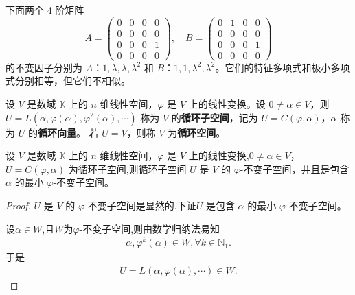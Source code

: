 \documentclass[../../main.tex]{subfiles}%
\begin{document}
\begin{example}
下面两个 4 阶矩阵
\[
A = \begin{pmatrix}
0 & 0 & 0 & 0 \\
0 & 0 & 0 & 0 \\
0 & 0 & 0 & 1 \\
0 & 0 & 0 & 0
\end{pmatrix}, \quad
B = \begin{pmatrix}
0 & 1 & 0 & 0 \\
0 & 0 & 0 & 0 \\
0 & 0 & 0 & 1 \\
0 & 0 & 0 & 0
\end{pmatrix}
\]
的不变因子分别为 $A$：$1,\lambda,\lambda,\lambda^2$ 和 $B$：$1,1,\lambda^2,\lambda^2$。它们的特征多项式和极小多项式分别相等，但它们不相似。 
\end{example}

\begin{definition}[循环子空间]\label{definition:循环子空间和循环空间}
设 \(V\) 是数域 \(\mathbb{K}\) 上的 \(n\) 维线性空间，\(\varphi\) 是 \(V\) 上的线性变换。设 \(0\neq\alpha\in V\)，则 \(U = L(\alpha,\varphi(\alpha),\varphi^2(\alpha),\cdots)\) 称为 \(V\) 的\textbf{循环子空间}，记为 \(U = C(\varphi,\alpha)\)，\(\alpha\) 称为 \(U\) 的\textbf{循环向量}。
若 \(U = V\)，则称 \(V\) 为\textbf{循环空间}。 
\end{definition}

\begin{theorem}[循环子空间的基本性质]\label{theorem:循环子空间的基本性质}
设 \(V\) 是数域 \(\mathbb{K}\) 上的 \(n\) 维线性空间，\(\varphi\) 是 \(V\) 上的线性变换,\(0\neq\alpha\in V\)， \(U = C(\varphi,\alpha)\) 为循环子空间,则循环子空间 \(U\) 是 \(V\) 的 \(\varphi\)-不变子空间，并且是包含 \(\alpha\) 的最小 \(\varphi\)-不变子空间。
\end{theorem}
\begin{proof}

\(U\) 是 \(V\) 的 \(\varphi\)-不变子空间是显然的.下证\(U\) 是包含 \(\alpha\) 的最小 \(\varphi\)-不变子空间。

设$\alpha \in W$,且$W$为$\varphi$-不变子空间,则由数学归纳法易知
\begin{align*}
\alpha,\varphi^k(\alpha)\in W,\forall k\in \mathbb{N}_1.
\end{align*}
于是
\begin{align*}
U=L(\alpha,\varphi(\alpha),\cdots)\in W.
\end{align*}

\end{proof}
\end{document}
